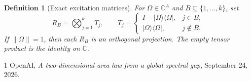 \documentclass[11pt]{article}
\newtheorem{definition}{Definition}
\begin{document}
\begin{definition}[Exact excitation matrices]
\label{def:replica_excitation_projection}
For $\Omega\in\mathbb C^A$ and $B\subseteq\{1,\ldots,k\}$, set
\[R_B=\bigotimes_{j=1}^k T_j,\qquad
T_j=\begin{cases}I-|\Omega\rangle\langle\Omega|,&j\in B,\\
|\Omega\rangle\langle\Omega|,&j\notin B.\end{cases}\]
If $\|\Omega\|=1$, then each $R_B$ is an orthogonal projection.
The empty tensor product is the identity on $\mathbb C$.
\end{definition}

\begin{thebibliography}{1}
 OpenAI, \emph{A two-dimensional area law from a
global spectral gap}, September 24, 2026.
\end{thebibliography}
\end{document}
